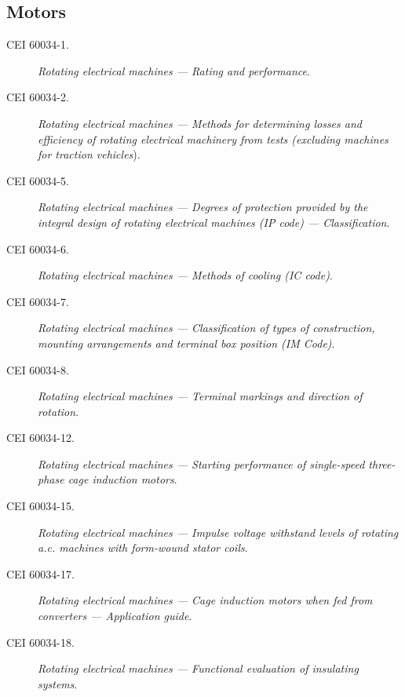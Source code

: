 \subsection*{Motors}
\begin{description}
    \item [\hspace{5mm}CEI 60034-1.] \textit{Rotating electrical machines --- Rating and performance}.
    \item [\hspace{5mm}CEI 60034-2.] \textit{Rotating electrical machines --- Methods for determining losses and
efficiency of rotating electrical machinery from tests (excluding machines for traction vehicles}).
    \item [\hspace{5mm}CEI 60034-5.] \textit{Rotating electrical machines --- Degrees of protection provided by the
integral design of rotating electrical machines (IP code) --- Classification}.
    \item [\hspace{5mm}CEI 60034-6.] \textit{Rotating electrical machines --- Methods of cooling (IC code)}.
    \item [\hspace{5mm}CEI 60034-7.] \textit{Rotating electrical machines --- Classification of types of construction, mounting arrangements and terminal box position (IM Code)}.
    \item [\hspace{5mm}CEI 60034-8.] \textit{Rotating electrical machines --- Terminal markings and direction of
rotation}.
    \item [\hspace{5mm}CEI 60034-12.] \textit{Rotating electrical machines --- Starting performance of single-speed
three-phase cage induction motors}.
    \item [\hspace{5mm}CEI 60034-15.] \textit{Rotating electrical machines --- Impulse voltage withstand levels of
rotating a.c. machines with form-wound stator coils}.
    \item [\hspace{5mm}CEI 60034-17.] \textit{Rotating electrical machines --- Cage induction motors when fed from
converters --- Application guide}.
    \item [\hspace{5mm}CEI 60034-18.] \textit{Rotating electrical machines --- Functional evaluation of insulating
systems}.
\end{description}

